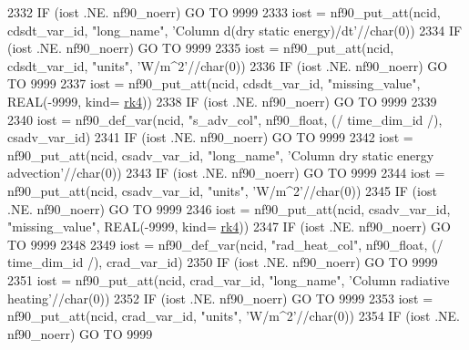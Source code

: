 \begin{DoxyCode}
{{{{{{2332     \textcolor{keywordflow}{IF} (iost .NE. nf90\_noerr) \textcolor{keywordflow}{GO TO} 9999
2333     iost    = nf90\_put\_att(ncid, cdsdt\_var\_id, \textcolor{stringliteral}{"long\_name"}, \textcolor{stringliteral}{'Column d(dry static energy)/dt'}//char(0))
2334     \textcolor{keywordflow}{IF} (iost .NE. nf90\_noerr) \textcolor{keywordflow}{GO TO} 9999
2335     iost    = nf90\_put\_att(ncid, cdsdt\_var\_id, \textcolor{stringliteral}{"units"}, \textcolor{stringliteral}{'W/m^2'}//char(0))
2336     \textcolor{keywordflow}{IF} (iost .NE. nf90\_noerr) \textcolor{keywordflow}{GO TO} 9999
2337     iost    = nf90\_put\_att(ncid, cdsdt\_var\_id, \textcolor{stringliteral}{"missing\_value"}, \textcolor{keywordtype}{REAL}(-9999, kind=
      \hyperlink{namespaceportable_abaed22a509442771d3fba69bebda0b33}{rk4}))
2338     \textcolor{keywordflow}{IF} (iost .NE. nf90\_noerr) \textcolor{keywordflow}{GO TO} 9999
2339 
2340     iost    = nf90\_def\_var(ncid, \textcolor{stringliteral}{"s\_adv\_col"}, nf90\_float, (/ time\_dim\_id /), csadv\_var\_id)
2341     \textcolor{keywordflow}{IF} (iost .NE. nf90\_noerr) \textcolor{keywordflow}{GO TO} 9999
2342     iost    = nf90\_put\_att(ncid, csadv\_var\_id, \textcolor{stringliteral}{"long\_name"}, \textcolor{stringliteral}{'Column dry static energy advection'}//char(0))
2343     \textcolor{keywordflow}{IF} (iost .NE. nf90\_noerr) \textcolor{keywordflow}{GO TO} 9999
2344     iost    = nf90\_put\_att(ncid, csadv\_var\_id, \textcolor{stringliteral}{"units"}, \textcolor{stringliteral}{'W/m^2'}//char(0))
2345     \textcolor{keywordflow}{IF} (iost .NE. nf90\_noerr) \textcolor{keywordflow}{GO TO} 9999
2346     iost    = nf90\_put\_att(ncid, csadv\_var\_id, \textcolor{stringliteral}{"missing\_value"}, \textcolor{keywordtype}{REAL}(-9999, kind=
      \hyperlink{namespaceportable_abaed22a509442771d3fba69bebda0b33}{rk4}))
2347     \textcolor{keywordflow}{IF} (iost .NE. nf90\_noerr) \textcolor{keywordflow}{GO TO} 9999
2348 
2349     iost    = nf90\_def\_var(ncid, \textcolor{stringliteral}{"rad\_heat\_col"}, nf90\_float, (/ time\_dim\_id /), crad\_var\_id)
2350     \textcolor{keywordflow}{IF} (iost .NE. nf90\_noerr) \textcolor{keywordflow}{GO TO} 9999
2351     iost    = nf90\_put\_att(ncid, crad\_var\_id, \textcolor{stringliteral}{"long\_name"}, \textcolor{stringliteral}{'Column radiative heating'}//char(0))
2352     \textcolor{keywordflow}{IF} (iost .NE. nf90\_noerr) \textcolor{keywordflow}{GO TO} 9999
2353     iost    = nf90\_put\_att(ncid, crad\_var\_id, \textcolor{stringliteral}{"units"}, \textcolor{stringliteral}{'W/m^2'}//char(0))
2354     \textcolor{keywordflow}{IF} (iost .NE. nf90\_noerr) \textcolor{keywordflow}{GO TO} 9999
}}}}}}
\end{DoxyCode}
